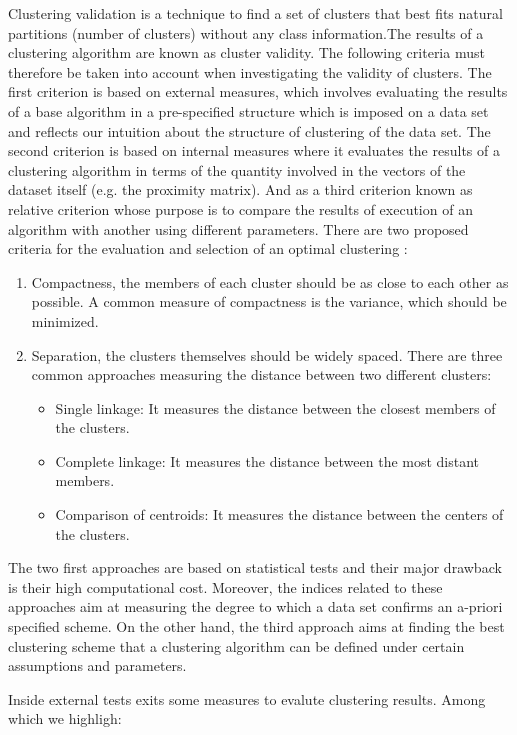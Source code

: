 Clustering validation is a technique to find a set of clusters that best fits natural partitions (number of clusters) without any class information.The results of a clustering algorithm are known as cluster validity. The following criteria must therefore be taken into account when investigating the validity of clusters. The first criterion is based on external measures, which involves evaluating the results of a base algorithm in a pre-specified structure which is imposed on a data set and reflects our intuition about the structure of clustering of the data set. The second criterion is based on internal measures where it evaluates the results of a clustering algorithm in terms of the quantity involved in the vectors of the dataset itself (e.g. the proximity matrix). And as a third criterion known as relative criterion whose purpose is to compare the results of execution of an algorithm with another using different parameters.
There are two proposed criteria for the evaluation and selection of an optimal clustering \cite{b53} \cite{b52}:
\begin{enumerate}
  \item Compactness, the members of each cluster should be as close to each other as possible. A common measure of compactness is the variance, which should be minimized.
  \item Separation, the clusters themselves should be widely spaced. There are three common approaches measuring the distance between two different clusters:
  \begin{itemize}
  \item Single linkage: It measures the distance between the closest members of the clusters.
  \item Complete linkage: It measures the distance between the most distant members.
  \item Comparison of centroids: It measures the distance between the centers of the clusters.
\end{itemize}
\end{enumerate}
The two first approaches are based on statistical tests and their major drawback is their high computational cost. Moreover, the indices related to these approaches aim at measuring the degree to which a data set confirms an a-priori specified scheme. On the other hand, the third approach aims at finding the best clustering scheme that a clustering algorithm can be defined under certain assumptions and parameters.

Inside external tests exits some measures to evalute clustering results. Among which we highligh:


